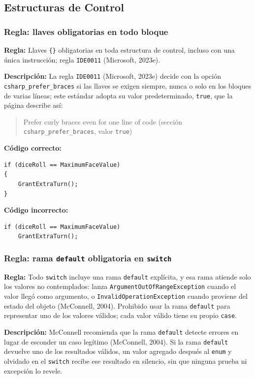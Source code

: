 \subsection{Estructuras de Control}

\subsubsection{Regla: llaves obligatorias en todo bloque}

\textbf{Regla:} Llaves \texttt{\{\}} obligatorias en toda estructura de control, incluso con una única instrucción; regla \texttt{IDE0011} (Microsoft, 2023e).

\textbf{Descripción:} La regla \texttt{IDE0011} (Microsoft, 2023e) decide con la opción \texttt{csharp\_\allowbreak prefer\_\allowbreak braces} si las llaves se exigen siempre, nunca o solo en los bloques de varias líneas; este estándar adopta su valor predeterminado, \texttt{true}, que la página describe así:
\begin{quote}
Prefer curly braces even for one line of code (sección \texttt{csharp\_prefer\_braces}, valor \texttt{true})
\end{quote}

\textbf{Código correcto:}
\begin{lstlisting}[style=csharpstyle]
if (diceRoll == MaximumFaceValue)
{
    GrantExtraTurn();
}
\end{lstlisting}

\textbf{Código incorrecto:}
\begin{lstlisting}[style=csharpstyle]
if (diceRoll == MaximumFaceValue)
    GrantExtraTurn();
\end{lstlisting}

\subsubsection{Regla: rama \texttt{default} obligatoria en \texttt{switch}}

\textbf{Regla:} Todo \texttt{switch} incluye una rama \texttt{default} explícita, y esa rama atiende solo los valores no contemplados: lanza \texttt{ArgumentOutOfRangeException} cuando el valor llegó como argumento, o \texttt{InvalidOperationException} cuando proviene del estado del objeto (McConnell, 2004). Prohibido usar la rama \texttt{default} para representar uno de los valores válidos; cada valor válido tiene su propio \texttt{case}.

\textbf{Descripción:} McConnell recomienda que la rama \texttt{default} detecte errores en lugar de esconder un caso legítimo (McConnell, 2004). Si la rama \texttt{default} devuelve uno de los resultados válidos, un valor agregado después al \texttt{enum} y olvidado en el \texttt{switch} recibe ese resultado en silencio, sin que ninguna prueba ni excepción lo revele.

